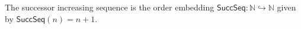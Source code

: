 \begin{definition}
The successor increasing sequence is the order embedding
$\mathsf{SuccSeq}:\mathbb N\hookrightarrow\mathbb N$ given by
$\mathsf{SuccSeq}(n)=n+1$.
\end{definition}
